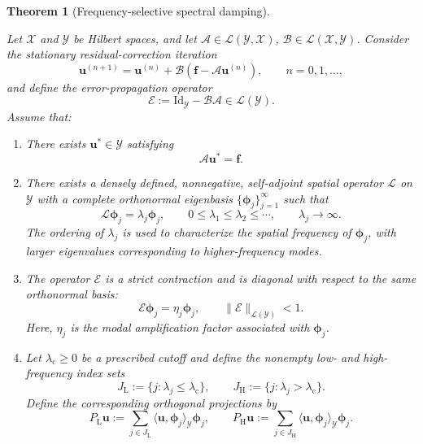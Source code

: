 \documentclass[preprint,numbers,sort&compress]{elsarticle}
\newtheorem{theorem}{Theorem}
\begin{document}
			\begin{theorem}[Frequency-selective spectral damping]
				\label{thm:spectral_convergence_operator}
				
				Let $\mathcal X$ and $\mathcal Y$ be Hilbert spaces, and let $\mathcal A\in\mathcal L(\mathcal Y,\mathcal X)$, $\mathcal B\in\mathcal L(\mathcal X,\mathcal Y)$. 
				Consider the stationary residual-correction iteration
				\[
				\boldsymbol u^{(n+1)}
				=
				\boldsymbol u^{(n)}
				+
				\mathcal B
				\left(
				\boldsymbol f-\mathcal A\boldsymbol u^{(n)}
				\right),
				\qquad n=0,1,\ldots,
				\]
				and define the error-propagation operator
				\[
				\mathcal E
				:=
				\mathrm{Id}_{\mathcal Y}-\mathcal B\mathcal A
				\in\mathcal L(\mathcal Y).
				\]
				Assume that:
				
				\begin{enumerate}
					\item[(i)]
					There exists $\boldsymbol u^*\in\mathcal Y$ satisfying
					\[
					\mathcal A\boldsymbol u^*=\boldsymbol f.
					\]
					
					\item[(ii)]
					There exists a densely defined, nonnegative, self-adjoint spatial
					operator $\mathcal L$ on $\mathcal Y$ with a complete orthonormal
					eigenbasis
					$\{\boldsymbol\phi_j\}_{j=1}^{\infty}$ such that
					\[
					\mathcal L\boldsymbol\phi_j
					=
					\lambda_j\boldsymbol\phi_j,
					\qquad
					0\leq\lambda_1\leq\lambda_2\leq\cdots,
					\qquad
					\lambda_j\to\infty.
					\]
					The ordering of $\lambda_j$ is used to characterize the spatial
					frequency of $\boldsymbol\phi_j$, with larger eigenvalues corresponding
					to higher-frequency modes.
					
					\item[(iii)]
					The operator $\mathcal E$ is a strict contraction and is diagonal with
					respect to the same orthonormal basis:
					\[
					\mathcal E\boldsymbol\phi_j
					=
					\eta_j\boldsymbol\phi_j,
					\qquad
					\|\mathcal E\|_{\mathcal L(\mathcal Y)}<1.
					\]
					Here, $\eta_j$ is the modal amplification factor associated with
					$\boldsymbol\phi_j$.
					
					\item[(iv)]
					Let $\lambda_{\mathrm c}\geq0$ be a prescribed cutoff and define the
					nonempty low- and high-frequency index sets
					\[
					J_{\mathrm L}
					:=
					\{j:\lambda_j\leq\lambda_{\mathrm c}\},
					\qquad
					J_{\mathrm H}
					:=
					\{j:\lambda_j>\lambda_{\mathrm c}\}.
					\]
					Define the corresponding orthogonal projections by
					\[
					P_{\mathrm L}\boldsymbol u
					:=
					\sum_{j\in J_{\mathrm L}}
					\langle\boldsymbol u,\boldsymbol\phi_j\rangle_{\mathcal Y}
					\boldsymbol\phi_j,
					\qquad
					P_{\mathrm H}\boldsymbol u
					:=
					\sum_{j\in J_{\mathrm H}}
					\langle\boldsymbol u,\boldsymbol\phi_j\rangle_{\mathcal Y}
					\boldsymbol\phi_j.
					\]
					

\end{enumerate}
\end{theorem}
\end{document}
